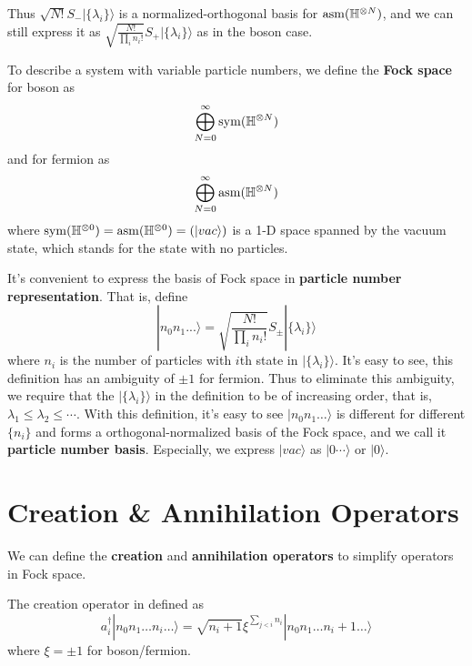 \documentclass[12pt]{book}
\begin{document}
	Thus $\sqrt{N!}S_-|\{\lambda_i\}\rangle$ is a normalized-orthogonal basis for ${\rm asm}(\mathbb H^{\otimes N})$, and we can still express it as $\sqrt{\frac{N!}{\prod_i n_i!}}S_+|\{\lambda_i\}\rangle$ as in the boson case.
	
	To describe a system with variable particle numbers, we define the \textbf{Fock space} for boson as
	\begin{equation}
		\bigoplus_{N=0}^\infty{\rm sym}(\mathbb H^{\otimes N})
	\end{equation}
	and for fermion as
	\begin{equation}
		\bigoplus_{N=0}^\infty{\rm asm}(\mathbb H^{\otimes N})
	\end{equation}
	where ${\rm sym}(\mathbb H^{\otimes 0})={\rm asm}(\mathbb H^{\otimes 0})=(|vac\rangle)$ is a 1-D space spanned by the vacuum state, which stands for the state with no particles.
	
	It's convenient to express the basis of Fock space in \textbf{particle number representation}. That is, define
	\begin{equation}
		|n_0n_1...\rangle=\sqrt{\frac{N!}{\prod_i n_i!}}S_\pm|\{\lambda_i\}\rangle
	\end{equation}
	where $n_i$ is the number of particles with $i$th state in $|\{\lambda_i\}\rangle$. It's easy to see, this definition has an ambiguity of $\pm1$ for fermion. Thus to eliminate this ambiguity, we require that the $|\{\lambda_i\}\rangle$ in the definition to be of increasing order, that is, $\lambda_1\leq\lambda_2\leq\cdots$. With this definition, it's easy to see $|n_0n_1\dots\rangle$ is different for different $\{n_i\}$ and forms a orthogonal-normalized basis of the Fock space, and we call it \textbf{particle number basis}. Especially, we express $|vac\rangle$ as $|0\cdots\rangle$ or $|0\rangle$.
	\section{Creation \& Annihilation Operators}
	We can define the \textbf{creation} and \textbf{annihilation operators} to simplify operators in Fock space.
	
	The creation operator in defined as
	\begin{equation}
		a_i^\dagger|n_0n_1\dots n_i\dots\rangle=\sqrt{n_i+1}\xi^{\sum_{j<i}n_i}|n_0n_1\dots n_i+1\dots\rangle
	\end{equation}
	where $\xi=\pm1$ for boson/fermion.
	
\end{document}
